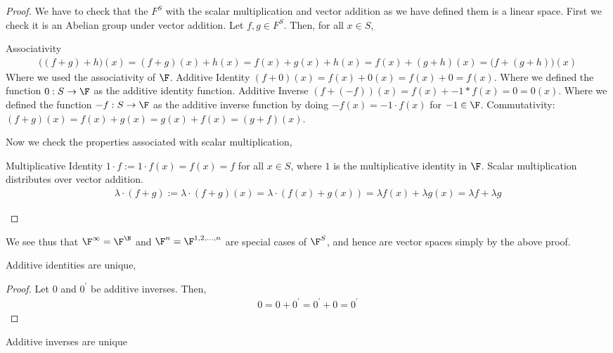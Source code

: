 \documentclass{article}
\begin{document}
  \begin{proof}
    We have to check that the $F^S$ with the scalar multiplication and vector addition as we have defined them is a linear space. First we check it is an Abelian group under
    vector addition. Let $f, g \in F^S$. Then, for all $x \in S$,
    \begin{enumerate}[label=\roman*)]
      \ii Associativity 
      \begin{align*}
        \big((f + g) + h\big)(x) = (f + g)(x) + h(x) = f(x) + g(x) + h(x) = f(x) + (g + h)(x) = \big(f + (g + h)\big)(x)
      \end{align*}
      Where we used the associativity of $\F$.
      \ii Additive Identity $(f + 0)(x) = f(x) + 0(x) = f(x) + 0 = f(x)$. Where we defined the function $0: S \to \F$ as the additive identity function.
      \ii Additive Inverse $(f + (-f))(x) = f(x) + -1*f(x) = 0 = 0(x)$. Where we defined the function $-f: S \to \F$ as the additive inverse function by doing $-f(x) = -1 \cdot
      f(x)$ for $-1 \in \F$.
      \ii Commutativity: $(f + g)(x) = f(x) + g(x) = g(x) + f(x) = (g + f)(x)$.
    \end{enumerate}
    Now we check the properties associated with scalar multiplication,
    \begin{enumerate}[label=\arabic*)]
      \ii Multiplicative Identity $1\cdot f := 1\cdot f(x) = f(x) = f$ for all $x \in S$, where $1$ is the multiplicative identity in $\F$.
      \ii Scalar multiplication distributes over vector addition. 
      \begin{align*}
        \lambda\cdot(f + g) := \lambda\cdot(f + g)(x) = \lambda\cdot(f(x) + g(x)) = \lambda f(x) + \lambda g(x) = \lambda f + \lambda g
      \end{align*}
    \end{enumerate}
  \end{proof}
  We see thus that $\F^\infty = \F^{\N}$ and $\F^n = \F^{1, 2, \dots, n}$ are special cases of $\F^S$, and hence are vector spaces simply by the above proof.
  \begin{prop}
    Additive identities are unique,
  \end{prop}
  \begin{proof}
    Let $0$ and $0^\prime$ be additive inverses. Then,
    \begin{align*}
      0 = 0 + 0^\prime = 0^\prime + 0 = 0^\prime
    \end{align*}
  \end{proof}
  \begin{prop}
    Additive inverses are unique
  \end{prop}
\end{document}
